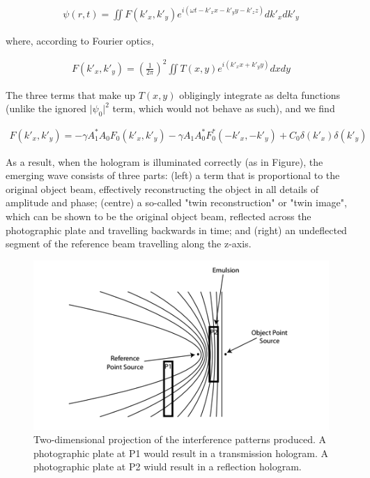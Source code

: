 \documentclass[12pt]{article}
\begin{document}
\vspace{-2ex}
\begin{gather*}
    \psi (r,t) = \iint F(k'_x,k'_y) e^{i(\omega t - k'_xx - k'_yy - k'_zz)} dk'_x dk'_y
\end{gather*}

where, according to Fourier optics,

\vspace{-2ex}
\begin{gather*}
    F(k'_x,k'_y) = \left( \frac{1}{2 \pi} \right)^2 \iint T(x,y) e^{i(k'_xx + k'_yy)} dxdy
\end{gather*}

The three terms that make up $T(x,y)$ obligingly integrate as delta functions (unlike the ignored $\lvert \psi_0 \rvert^2$ term, which would not behave as such), and we find

\vspace{-2ex}
\begin{gather*}
    F(k'_x,k'_y) = - \gamma A_1^* A_0 F_0 (k'_x,k'_y) - \gamma A_1 A_0^* F_0^* (-k'_x, -k'_y) + C_0 \delta (k'_x)\delta(k'_y)
\end{gather*}

As a result, when the hologram is illuminated correctly (as in Figure), the emerging wave consists of three parts: (left) a term that is proportional to the original object beam, effectively
reconstructing the object in all details of amplitude and phase; (centre) a so-called "twin reconstruction" or "twin image", which can be shown to be the original object beam, reflected across the
photographic plate and travelling backwards in time; and (right) an undeflected segment of the reference beam travelling along the z-axis.

\begin{figure}[H]
    \centering
    \includegraphics[width=.7\textwidth]{holography1.png}
    \caption{Two-dimensional projection of the interference patterns produced. A photographic plate at P1 would result in a transmission hologram.
    A photographic plate at P2 wiuld result in a reflection hologram. \protect\cite{princetonholo}}
    \label{fig:3}
\end{figure}
\end{document}
